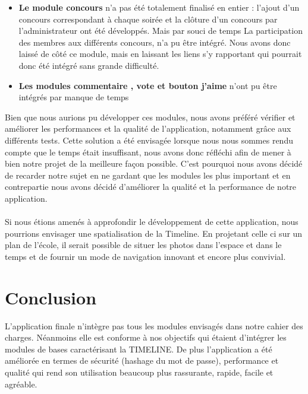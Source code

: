 \documentclass[11pt]{article} %
\begin{document}
\begin{itemize}
\item \textbf{Le module concours} n’a pas été totalement finalisé en entier : l’ajout d’un concours correspondant à chaque soirée et la clôture d’un concours par l’administrateur ont été développés. Mais par souci de temps  La participation des membres aux différents concours,  n’a pu être intégré. Nous avons donc laissé de côté ce module, mais en laissant les liens s'y rapportant qui pourrait donc été intégré sans grande 
difficulté.  

\item \textbf{Les modules commentaire , vote et bouton j’aime} n’ont pu être  intégrés par manque de temps
\end{itemize}

Bien que nous aurions pu développer ces modules, nous avons préféré vérifier et améliorer les performances et la qualité de l’application, notamment grâce aux différents tests. Cette solution a été envisagée lorsque nous nous sommes rendu compte que le temps était insuffisant, nous avons donc réfléchi afin de mener à bien notre projet de la meilleure façon possible. C'est pourquoi nous avons décidé de recarder notre sujet en ne gardant que les modules les plus important et en contrepartie nous avons décidé d'améliorer la qualité et la performance de notre application.\\
\\
Si nous étions amenés à approfondir le développement de cette application, nous pourrions envisager une spatialisation de la Timeline. En projetant celle ci sur un plan de l'école, il serait possible de situer les photos dans l'espace et dans le temps et de fournir un mode de navigation innovant et encore plus convivial.

\section{Conclusion}
L'application finale n'intègre pas tous les modules envisagés dans notre cahier des charges. Néanmoins elle est conforme à nos objectifs qui étaient d'intégrer les modules de bases caractérisant la TIMELINE. De plus l'application a été améliorée en termes de sécurité (hashage du mot de passe), performance et qualité qui rend son utilisation beaucoup plus rassurante, rapide, facile et agréable. 
\end{document}
